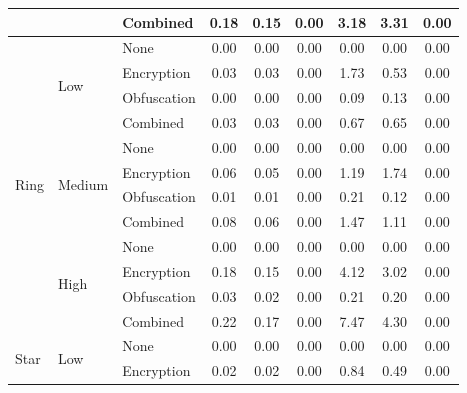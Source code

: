 \begin{table}[!t]
\begin{tabular}{lllccc ccc}
 &  & Combined & 0.18 & 0.15 & \cellcolor[gray]{0.70}0.00 & 3.18 & 3.31 & \cellcolor[gray]{0.70}0.00 \\
\midrule
\multirow{12}{*}{Ring} & \multirow{4}{*}{Low} & None & \cellcolor[gray]{0.70}0.00 & \cellcolor[gray]{0.70}0.00 & \cellcolor[gray]{0.70}0.00 & \cellcolor[gray]{0.70}0.00 & \cellcolor[gray]{0.70}0.00 & \cellcolor[gray]{0.70}0.00 \\
 &  & Encryption & 0.03 & 0.03 & \cellcolor[gray]{0.70}0.00 & 1.73 & 0.53 & \cellcolor[gray]{0.70}0.00 \\
 &  & Obfuscation & 0.00 & 0.00 & \cellcolor[gray]{0.70}0.00 & 0.09 & 0.13 & \cellcolor[gray]{0.70}0.00 \\
 &  & Combined & 0.03 & 0.03 & \cellcolor[gray]{0.70}0.00 & 0.67 & 0.65 & \cellcolor[gray]{0.70}0.00 \\
\cmidrule(lr){2-9}
 & \multirow{4}{*}{Medium} & None & \cellcolor[gray]{0.70}0.00 & \cellcolor[gray]{0.70}0.00 & \cellcolor[gray]{0.70}0.00 & \cellcolor[gray]{0.70}0.00 & \cellcolor[gray]{0.70}0.00 & \cellcolor[gray]{0.70}0.00 \\
 &  & Encryption & 0.06 & 0.05 & \cellcolor[gray]{0.70}0.00 & 1.19 & 1.74 & \cellcolor[gray]{0.70}0.00 \\
 &  & Obfuscation & 0.01 & 0.01 & \cellcolor[gray]{0.70}0.00 & 0.21 & 0.12 & \cellcolor[gray]{0.70}0.00 \\
 &  & Combined & 0.08 & 0.06 & \cellcolor[gray]{0.70}0.00 & 1.47 & 1.11 & \cellcolor[gray]{0.70}0.00 \\
\cmidrule(lr){2-9}
 & \multirow{4}{*}{High} & None & \cellcolor[gray]{0.70}0.00 & \cellcolor[gray]{0.70}0.00 & \cellcolor[gray]{0.70}0.00 & \cellcolor[gray]{0.70}0.00 & \cellcolor[gray]{0.70}0.00 & \cellcolor[gray]{0.70}0.00 \\
 &  & Encryption & 0.18 & 0.15 & \cellcolor[gray]{0.70}0.00 & 4.12 & 3.02 & \cellcolor[gray]{0.70}0.00 \\
 &  & Obfuscation & 0.03 & 0.02 & \cellcolor[gray]{0.70}0.00 & 0.21 & 0.20 & \cellcolor[gray]{0.70}0.00 \\
 &  & Combined & 0.22 & 0.17 & \cellcolor[gray]{0.70}0.00 & 7.47 & 4.30 & \cellcolor[gray]{0.70}0.00 \\
\midrule
\multirow{12}{*}{Star} & \multirow{4}{*}{Low} & None & \cellcolor[gray]{0.70}0.00 & \cellcolor[gray]{0.70}0.00 & \cellcolor[gray]{0.70}0.00 & \cellcolor[gray]{0.70}0.00 & \cellcolor[gray]{0.70}0.00 & \cellcolor[gray]{0.70}0.00 \\
 &  & Encryption & 0.02 & 0.02 & \cellcolor[gray]{0.70}0.00 & 0.84 & 0.49 & \cellcolor[gray]{0.70}0.00 \\

\end{tabular}
\end{table}
